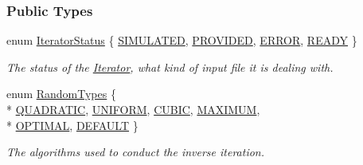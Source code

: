 \subsubsection*{Public Types}
\begin{DoxyCompactItemize}
\item 
enum \hyperlink{class_iterator_a1eb24c519953c2a333ea4a345b0c679c}{Iterator\+Status} \{ \hyperlink{class_iterator_a1eb24c519953c2a333ea4a345b0c679ca4628ad7429670e1077771e61b8bf62e8}{S\+I\+M\+U\+L\+A\+T\+E\+D}, 
\hyperlink{class_iterator_a1eb24c519953c2a333ea4a345b0c679ca5988fd5ab1694c99fea267cb1bd5b980}{P\+R\+O\+V\+I\+D\+E\+D}, 
\hyperlink{class_iterator_a1eb24c519953c2a333ea4a345b0c679ca47bbd9862188e6e2599aeb2396c39465}{E\+R\+R\+O\+R}, 
\hyperlink{class_iterator_a1eb24c519953c2a333ea4a345b0c679caf2fc3a710537acfd818d4b982779176e}{R\+E\+A\+D\+Y}
 \}
\begin{DoxyCompactList}\small\item\em The status of the \hyperlink{class_iterator}{Iterator}, what kind of input file it is dealing with. \end{DoxyCompactList}\item 
enum \hyperlink{class_iterator_a68bc1c5e7ad39ed78690beaa8a607430}{Random\+Types} \{ \\*
\hyperlink{class_iterator_a68bc1c5e7ad39ed78690beaa8a607430a1376e2aba7a2d8ff9240ed369a5bc08b}{Q\+U\+A\+D\+R\+A\+T\+I\+C}, 
\hyperlink{class_iterator_a68bc1c5e7ad39ed78690beaa8a607430a44ed6f57f51bfc11730908f722fdbb5f}{U\+N\+I\+F\+O\+R\+M}, 
\hyperlink{class_iterator_a68bc1c5e7ad39ed78690beaa8a607430aad4185989c35b8c829dcafe0522ac05d}{C\+U\+B\+I\+C}, 
\hyperlink{class_iterator_a68bc1c5e7ad39ed78690beaa8a607430a0df1706a866c50be36b9fe29db81af26}{M\+A\+X\+I\+M\+U\+M}, 
\\*
\hyperlink{class_iterator_a68bc1c5e7ad39ed78690beaa8a607430ac26704076bf61ec7a63ef3ece6440a05}{O\+P\+T\+I\+M\+A\+L}, 
\hyperlink{class_iterator_a68bc1c5e7ad39ed78690beaa8a607430a6a17018cada1b3e646688ff845888f8d}{D\+E\+F\+A\+U\+L\+T}
 \}
\begin{DoxyCompactList}\small\item\em The algorithms used to conduct the inverse iteration. \end{DoxyCompactList}\end{DoxyCompactItemize}
